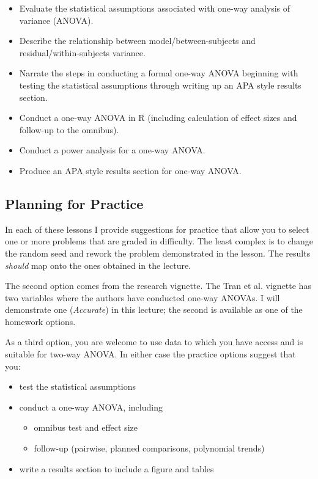 \documentclass[
  11pt,
]{book}
\providecommand{\tightlist}{%
  \setlength{\itemsep}{0pt}\setlength{\parskip}{0pt}}
\begin{document}
\begin{itemize}
\tightlist
\item
  Evaluate the statistical assumptions associated with one-way analysis of variance (ANOVA).
\item
  Describe the relationship between model/between-subjects and residual/within-subjects variance.
\item
  Narrate the steps in conducting a formal one-way ANOVA beginning with testing the statistical assumptions through writing up an APA style results section.
\item
  Conduct a one-way ANOVA in R (including calculation of effect sizes and follow-up to the omnibus).
\item
  Conduct a power analysis for a one-way ANOVA.
\item
  Produce an APA style results section for one-way ANOVA.
\end{itemize}

\hypertarget{planning-for-practice-4}{%
\subsection{Planning for Practice}\label{planning-for-practice-4}}

In each of these lessons I provide suggestions for practice that allow you to select one or more problems that are graded in difficulty. The least complex is to change the random seed and rework the problem demonstrated in the lesson. The results \emph{should} map onto the ones obtained in the lecture.

The second option comes from the research vignette. The Tran et al. \citeyearpar{tran_you_2014} vignette has two variables where the authors have conducted one-way ANOVAs. I will demonstrate one (\emph{Accurate}) in this lecture; the second is available as one of the homework options.

As a third option, you are welcome to use data to which you have access and is suitable for two-way ANOVA. In either case the practice options suggest that you:

\begin{itemize}
\tightlist
\item
  test the statistical assumptions
\item
  conduct a one-way ANOVA, including

  \begin{itemize}
  \tightlist
  \item
    omnibus test and effect size
  \item
    follow-up (pairwise, planned comparisons, polynomial trends)
  \end{itemize}
\item
  write a results section to include a figure and tables
\end{itemize}
\end{document}
